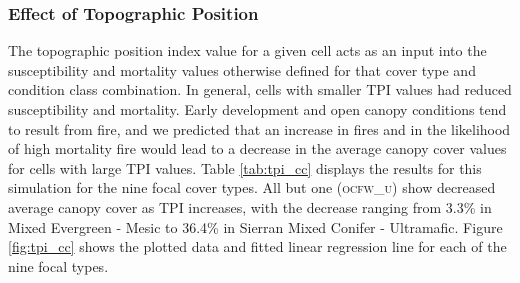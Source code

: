 \clearpage
\subsubsection{Effect of Topographic Position} 

The topographic position index value for a given cell acts as an input into the susceptibility and mortality values otherwise defined for that cover type and condition class combination. In general, cells with smaller TPI values had reduced susceptibility and mortality. Early development and open canopy conditions tend to result from fire, and we predicted that an increase in fires and in the likelihood of high mortality fire would lead to a decrease in the average canopy cover values for cells with large TPI values. Table \ref{tab:tpi_cc} displays the results for this simulation for the nine focal cover types. All but one (\textsc{ocfw\_u}) show decreased average canopy cover as TPI increases, with the decrease ranging from 3.3\% in Mixed Evergreen - Mesic to 36.4\% in Sierran Mixed Conifer - Ultramafic. Figure \ref{fig:tpi_cc} shows the plotted data and fitted linear regression line for each of the nine focal types. 

